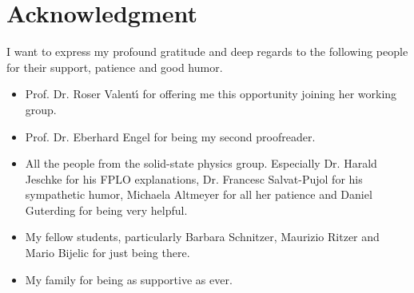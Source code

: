 \chapter{Acknowledgment}
	I want to express my profound gratitude and deep regards to the following people for their support, patience and good humor.
	\begin{itemize}
		\item Prof. Dr. Roser Valent\'{\i}  for offering me this opportunity joining her working group.
		\item Prof. Dr. Eberhard Engel for being my second proofreader.
		\item All the people from the solid-state physics group. Especially Dr. Harald Jeschke for his FPLO explanations, Dr. Francesc Salvat-Pujol for his sympathetic humor, Michaela Altmeyer for all her patience and Daniel Guterding for being very helpful.
		\item My fellow students, particularly Barbara Schnitzer, Maurizio Ritzer and Mario Bijelic for just being there. 
		\item My family for being as supportive as ever.
	\end{itemize}